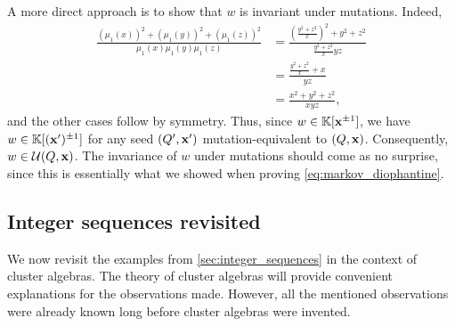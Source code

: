 \begin{example}
	A more direct approach is to show that $w$ is invariant under mutations. Indeed,
	\begin{align*}
		\frac{(\mu_1(x))^2 + (\mu_1(y))^2 + (\mu_1(z))^2}{\mu_1(x)\mu_1(y)\mu_1(z)}
		 & = \frac{\left(\frac{y^2 + z^2}{x}\right)^2 + y^2 + z^2}{\frac{y^2 + z^2}{x}yz} \\
		 & = \frac{\frac{y^2 + z^2}{x} + x}{yz}                                           \\
		 & = \frac{x^2 + y^2 + z^2}{xyz},
	\end{align*}
	and the other cases follow by symmetry. Thus, since $w \in \mathbb{K}[\mathbf{x}^{\pm 1}]$, we have
	$w \in \mathbb{K}[(\mathbf{x}')^{\pm 1}]$ for any seed $(Q', \mathbf{x}')$ mutation-equivalent to $(Q,
		\mathbf{x})$. Consequently, $w \in \mathcal{U}(Q, \mathbf{x})$. The invariance of $w$ under mutations should
	come as no surprise, since this is essentially what we showed when proving
	\cref{eq:markov_diophantine}.
\end{example}

\subsection{Integer sequences revisited}\label{sec:sequences_revisited}

We now revisit the examples from \cref{sec:integer_sequences} in the context of cluster
algebras. The theory of cluster algebras will provide convenient explanations for the
observations made. However, all the mentioned observations were already known long
before cluster algebras were invented.

